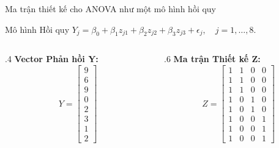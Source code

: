 \begin{frame}{Ma trận thiết kế cho ANOVA như một mô hình hồi quy}
    
    \begin{block}{Mô hình Hồi quy}
        $Y_j = \beta_0 + \beta_1z_{j1} + \beta_2z_{j2} + \beta_3z_{j3} + \epsilon_j, \quad j=1, \dots, 8$.
    \end{block}
    
    
    \begin{columns}[T] %
        \begin{column}{.4\textwidth}
            \textbf{Vector Phản hồi Y:}
            \[
            Y = \begin{bmatrix} 9 \\ 6 \\ 9 \\ 0 \\ 2 \\ 3 \\ 1 \\ 2 \end{bmatrix}
            \]
        \end{column}
        \begin{column}{.6\textwidth}
            \textbf{Ma trận Thiết kế Z:}
            \[
            Z = \begin{bmatrix} 
            1 & 1 & 0 & 0 \\ 
            1 & 1 & 0 & 0 \\ 
            1 & 1 & 0 & 0 \\ 
            1 & 0 & 1 & 0 \\ 
            1 & 0 & 1 & 0 \\ 
            1 & 0 & 0 & 1 \\ 
            1 & 0 & 0 & 1 \\ 
            1 & 0 & 0 & 1 
            \end{bmatrix}
            \]
        \end{column}
    \end{columns}
    
    \vspace{1em} %


\end{frame}

